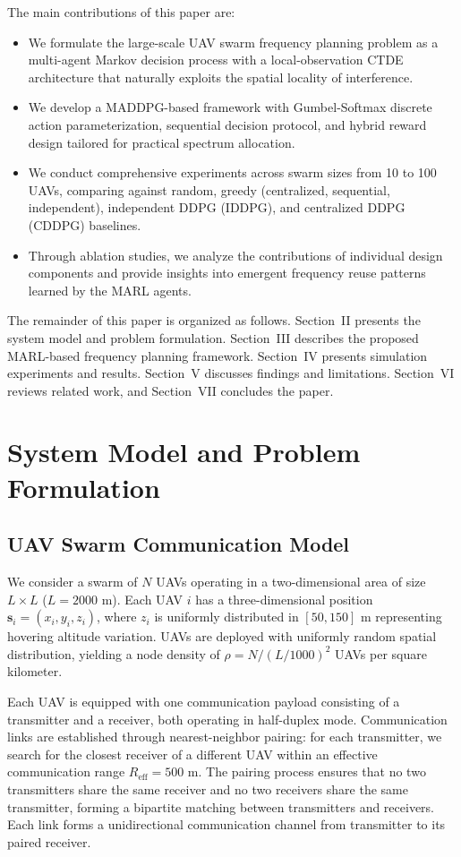 \documentclass[conference]{IEEEtran}
\begin{document}
The main contributions of this paper are:
\begin{itemize}
    \item We formulate the large-scale UAV swarm frequency planning problem as a multi-agent Markov decision process with a local-observation CTDE architecture that naturally exploits the spatial locality of interference.
    \item We develop a MADDPG-based framework with Gumbel-Softmax discrete action parameterization, sequential decision protocol, and hybrid reward design tailored for practical spectrum allocation.
    \item We conduct comprehensive experiments across swarm sizes from 10 to 100 UAVs, comparing against random, greedy (centralized, sequential, independent), independent DDPG (IDDPG), and centralized DDPG (CDDPG) baselines.
    \item Through ablation studies, we analyze the contributions of individual design components and provide insights into emergent frequency reuse patterns learned by the MARL agents.
\end{itemize}

The remainder of this paper is organized as follows. Section~II presents the system model and problem formulation. Section~III describes the proposed MARL-based frequency planning framework. Section~IV presents simulation experiments and results. Section~V discusses findings and limitations. Section~VI reviews related work, and Section~VII concludes the paper.

\section{System Model and Problem Formulation}

\subsection{UAV Swarm Communication Model}

We consider a swarm of $N$ UAVs operating in a two-dimensional area of size $L \times L$ ($L = 2000$ m). Each UAV $i$ has a three-dimensional position $\mathbf{s}_i = (x_i, y_i, z_i)$, where $z_i$ is uniformly distributed in $[50, 150]$ m representing hovering altitude variation. UAVs are deployed with uniformly random spatial distribution, yielding a node density of $\rho = N / (L/1000)^2$ UAVs per square kilometer.

Each UAV is equipped with one communication payload consisting of a transmitter and a receiver, both operating in half-duplex mode. Communication links are established through nearest-neighbor pairing: for each transmitter, we search for the closest receiver of a different UAV within an effective communication range $R_{\text{eff}} = 500$ m. The pairing process ensures that no two transmitters share the same receiver and no two receivers share the same transmitter, forming a bipartite matching between transmitters and receivers. Each link forms a unidirectional communication channel from transmitter to its paired receiver.
\end{document}
